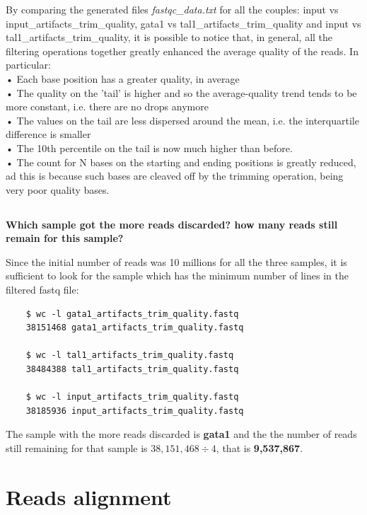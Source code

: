 \documentclass[12pt, a4paper]{article}
\begin{document}
	By comparing the generated files \textit{fastqc\_data.txt} for all the couples: input vs input\_artifacts\_trim\_quality, gata1 vs tal1\_artifacts\_trim\_quality and input vs tal1\_artifacts\_trim\_quality, it is possible to notice that, in general, all the filtering operations together greatly enhanced the average quality of the reads. In particular:\\
	• Each base position has a greater quality, in average\\
	• The quality on the 'tail' is higher and so the average-quality trend tends to be more constant, i.e. there are no drops anymore\\
	• The values on the tail are less dispersed around the mean, i.e. the interquartile difference is smaller\\
	• The 10th percentile on the tail is now much higher than before.\\
	• The count for N bases on the starting and ending positions is greatly reduced, ad this is because such bases are cleaved off by the trimming operation, being very poor quality bases.\\
	
	\subsection{}
	\textbf{Which sample got the more reads discarded? how many reads still remain for this sample?}
	
	Since the initial number of reads was 10 millions for all the three samples, it is sufficient to look for the sample which has the minimum number of lines in the filtered fastq file:
	
	\begin{verbatim}
	$ wc -l gata1_artifacts_trim_quality.fastq 
	38151468 gata1_artifacts_trim_quality.fastq
	
	$ wc -l tal1_artifacts_trim_quality.fastq 
	38484388 tal1_artifacts_trim_quality.fastq
	
	$ wc -l input_artifacts_trim_quality.fastq 
	38185936 input_artifacts_trim_quality.fastq
	\end{verbatim}
	
	The sample with the more reads discarded is \textbf{gata1} and the the number of reads still remaining for that sample is $38,151,468 \div 4$, that is \textbf{9,537,867}.
	
	\section{Reads alignment}
	
\end{document}
